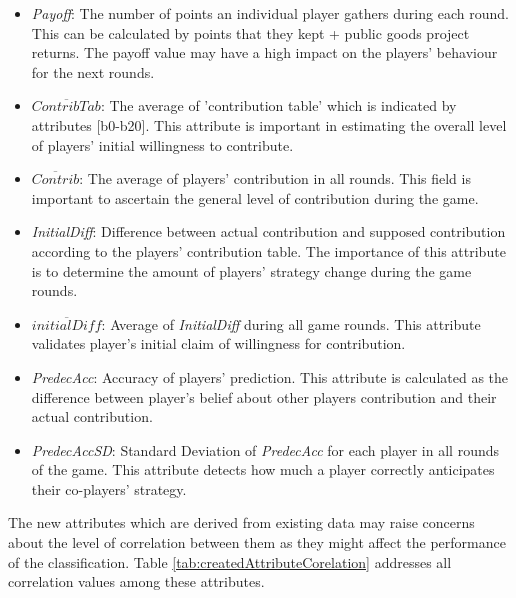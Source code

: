\begin{itemize}
    \item  \textit{Payoff}: The number of points an individual player gathers during each round. This can be calculated by points that they kept + public goods project returns. The payoff value may have a high impact on the players' behaviour for the next rounds.
    
    \item  \textit{$ \overline{ContribTab} $}: The average of 'contribution table' which is indicated by attributes [b0-b20]. This attribute is important in estimating the overall level of players' initial willingness to contribute.
    
    \item  \textit{$ \overline{Contrib} $}: The average of players' contribution in all rounds. This field is important to ascertain the general level of contribution during the game.
    
    \item  \textit{InitialDiff}: Difference between actual contribution and supposed contribution according to the players' contribution table. The importance of this attribute is to determine the amount of players' strategy change during the game rounds.
    
    \item  \textit{$ \overline{initialDiff} $}: Average of \textit{InitialDiff} during all game rounds. This attribute validates player's initial claim of willingness for contribution.
    
    \item \textit{PredecAcc}: Accuracy of players' prediction. This attribute is calculated as the difference between player's belief about other players contribution and their actual contribution.
    
    \item  \textit{PredecAccSD}: Standard Deviation of \textit{PredecAcc} for each player in all rounds of the game. This attribute detects how much a player correctly anticipates their co-players' strategy.
    
\end{itemize}


The new attributes which are derived from existing data may raise concerns about the level of correlation between them as they might affect the performance of the classification. Table \ref{tab:createdAttributeCorelation} addresses all correlation values among these attributes.

